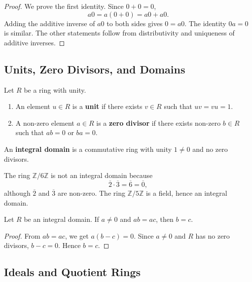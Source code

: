 \begin{proof}
We prove the first identity. Since $0+0=0$,
\[
    a0=a(0+0)=a0+a0.
\]
Adding the additive inverse of $a0$ to both sides gives $0=a0$. The identity $0a=0$ is similar. The other statements follow from distributivity and uniqueness of additive inverses.
\end{proof}

\subsection{Units, Zero Divisors, and Domains}

\begin{definition}
Let $R$ be a ring with unity.
\begin{enumerate}
    \item An element $u\in R$ is a \textbf{unit} if there exists $v\in R$ such that $uv=vu=1$.
    \item A non-zero element $a\in R$ is a \textbf{zero divisor} if there exists non-zero $b\in R$ such that $ab=0$ or $ba=0$.
\end{enumerate}
\end{definition}

\begin{definition}
An \textbf{integral domain} is a commutative ring with unity $1\neq 0$ and no zero divisors.
\end{definition}

\begin{example}
The ring $\mathbb{Z}/6\mathbb{Z}$ is not an integral domain because
\[
    \overline{2}\cdot\overline{3}=\overline{6}=\overline{0},
\]
although $\overline{2}$ and $\overline{3}$ are non-zero. The ring $\mathbb{Z}/5\mathbb{Z}$ is a field, hence an integral domain.
\end{example}

\begin{proposition}
Let $R$ be an integral domain. If $a\neq 0$ and $ab=ac$, then $b=c$.
\end{proposition}

\begin{proof}
From $ab=ac$, we get $a(b-c)=0$. Since $a\neq 0$ and $R$ has no zero divisors, $b-c=0$. Hence $b=c$.
\end{proof}

\subsection{Ideals and Quotient Rings}


